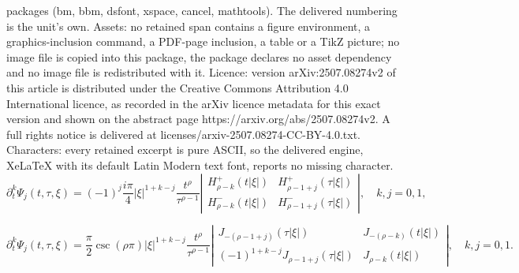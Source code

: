 \documentclass[10pt,a4paper]{amsart}
\begin{document}
packages (bm, bbm, dsfont, xspace, cancel, mathtools). The delivered numbering is the unit's own. Assets: no retained span contains a figure environment, a graphics-inclusion command, a PDF-page inclusion, a table or a TikZ picture; no image file is copied into this package, the package declares no asset dependency and no image file is redistributed with it. Licence: version arXiv:2507.08274v2 of this article is distributed under the Creative Commons Attribution 4.0 International licence, as recorded in the arXiv licence metadata for this exact version and shown on the abstract page https://arxiv.org/abs/2507.08274v2. A full rights notice is delivered at licenses/arxiv-2507.08274-CC-BY-4.0.txt. Characters: every retained excerpt is pure ASCII, so the delivered engine, XeLaTeX with its default Latin Modern text font, reports no missing character.
\begin{equation}\label{equ:q9}
\partial_{t}^{k} \Psi_{j}(t, \tau, \xi)=(-1)^{j} \frac{i \pi}{4}|\xi|^{1+k-j} \frac{t^{\rho}}{\tau^{\rho-1}}\left|\begin{array}{ll}
H_{\rho-k}^{+}(t|\xi|) & H_{\rho-1+j}^{+}(\tau|\xi|)  \\
H_{\rho-k}^{-}(t|\xi|) & H_{\rho-1+j}^{-}(\tau|\xi|)
\end{array}\right|,\quad  k,j=0,1,
\end{equation}

\begin{equation}\label{equ:q11}
\partial_{t}^{k} \Psi_{j}(t, \tau, \xi)=\frac{\pi}{2} \csc  (\rho \pi)|\xi|^{1+k-j} \frac{t^{\rho}}{\tau^{\rho-1}}
 \left|\begin{array}{cc}
J_{-(\rho-1+j)}(\tau|\xi|) & J_{-(\rho-k)}(t|\xi|) \\
(-1)^{1+k-j} J_{\rho-1+j}(\tau|\xi|) & J_{\rho-k}(t|\xi|)
\end{array}\right|,\quad  k, j=0,1.
\end{equation}
\end{document}
